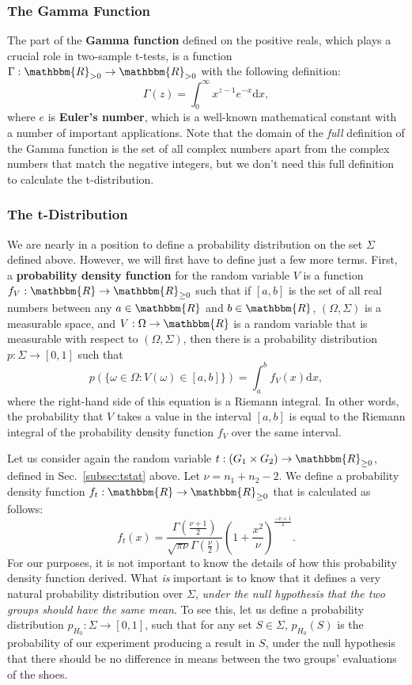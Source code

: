 \documentclass[11pt]{article}
\theoremstyle{definition}
\theoremstyle{remark}
\begin{document}
\subsubsection{The Gamma Function}
The part of the \textbf{Gamma function} defined on the positive reals, which plays a crucial role in two-sample t-tests, is a function $\Gamma:\mathbbm{R}_{>0}\rightarrow\mathbbm{R}_{>0}$ with the following definition:
$$\Gamma(z)=\int_{0}^{\infty}x^{z-1}e^{-x}\textrm{d}x,$$
where $e$ is \textbf{Euler's number}, which is a well-known mathematical constant with a number of important applications. Note that the domain of the \textit{full} definition of the Gamma function is the set of all complex numbers apart from the complex numbers that match the negative integers, but we don't need this full definition to calculate the t-distribution.

\subsubsection{The t-Distribution}
We are nearly in a position to define a probability distribution on the set $\Sigma$ defined above. However, we will first have to define just a few more terms. First, a \textbf{probability density function} for the random variable $V$ is a function $f_{V}:\mathbbm{R}\rightarrow\mathbbm{R}_{\geq0}$ such that if $[a,b]$ is the set of all real numbers between any $a\in\mathbbm{R}$ and $b\in\mathbbm{R}$, $(\Omega,\Sigma)$ is a measurable space, and $V:\Omega\rightarrow\mathbbm{R}$ is a random variable that is measurable with respect to $(\Omega,\Sigma)$, then there is a probability distribution $p:\Sigma\rightarrow[0,1]$ such that
$$p(\{\omega\in\Omega:V(\omega)\in [a,b]\})=\int_{a}^{b}f_{V}(x)\textrm{d}x,$$
where the right-hand side of this equation is a Riemann integral. In other words, the probability that $V$ takes a value in the interval $[a,b]$ is equal to the Riemann integral of the probability density function $f_{V}$ over the same interval.\par 

Let us consider again the random variable $t:(G_{1}\times G_{2})\rightarrow \mathbbm{R}_{\geq0}$, defined in Sec.~\ref{subsec:tstat} above. Let $\nu=n_{1}+n_{2}-2$. We define a probability density function $f_{t}:\mathbbm{R}\rightarrow\mathbbm{R}_{\geq0}$ that is calculated as follows:
$$f_{t}(x)=\frac{\Gamma\left(\frac{\nu+1}{2}\right)}{\sqrt{\pi\nu}\Gamma\left(\frac{\nu}{2}\right)}\left(1+\frac{x^{2}}{\nu}\right)^{\frac{-\nu+1}{2}}.$$
For our purposes, it is not important to know the details of how this probability density function derived. What \textit{is} important is to know that it defines a very natural probability distribution over $\Sigma$, \textit{under the null hypothesis that the two groups should have the same mean}. To see this, let us define a probability distribution $p_{H_{0}}:\Sigma\rightarrow[0,1]$, such that for any set $S\in\Sigma$, $p_{H_{0}}(S)$ is the probability of our experiment producing a result in $S$, under the null hypothesis that there should be no difference in means between the two groups' evaluations of the shoes.\par 
\end{document}
